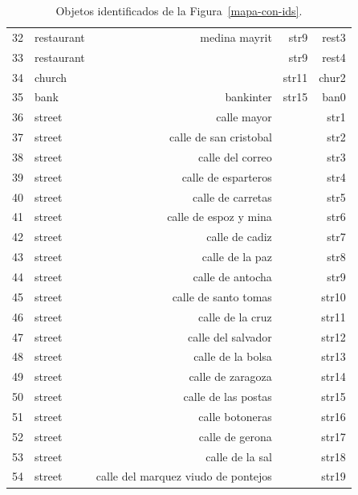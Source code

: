 \begin{table}[!t]
{\begin{center}
\begin{tabular}{|l|l|r|r|r|}
32&restaurant & medina mayrit & str9 & rest3\\
33&restaurant & & str9 & rest4\\
34&church & & str11 & chur2\\
35&bank & bankinter & str15 & ban0\\
36&street & calle mayor & & str1 \\
37&street & calle de san cristobal & & str2\\
38&street & calle del correo & & str3\\
39&street & calle de esparteros & & str4\\
40&street & calle de carretas & & str5\\
41&street & calle de espoz y mina & & str6\\
42&street & calle de cadiz & & str7\\
43&street & calle de la paz & & str8\\
44&street & calle de antocha & & str9\\
45&street & calle de santo tomas & & str10\\
46&street & calle de la cruz & & str11\\
47&street & calle del salvador & & str12\\
48&street & calle de la bolsa & & str13\\
49&street & calle de zaragoza & & str14\\
50&street & calle de las postas & & str15\\
51&street & calle botoneras & & str16\\
52&street & calle de gerona & & str17\\
53&street & calle de la sal & & str18\\
54&street & calle del marquez viudo de pontejos & & str19\\
\hline
\end{tabular}
\caption{Objetos identificados de la Figura~\ref{mapa-con-ids}.\label{tabla-ids}}
\vspace*{-.5cm}
\end{center}
}
\end{table}

